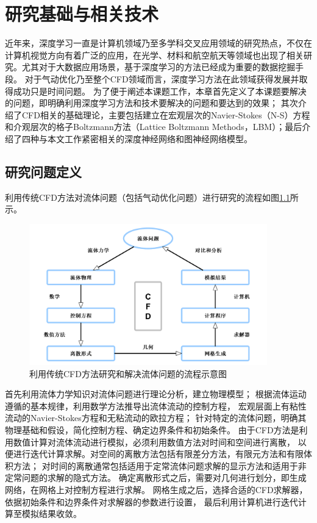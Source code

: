 \chapter{研究基础与相关技术}

近年来，深度学习一直是计算机领域乃至多学科交叉应用领域的研究热点，不仅在计算机视觉方向有着广泛的应用，在光学、材料和航空航天等领域也出现了相关研究。尤其对于大数据应用场景，基于深度学习的方法已经成为重要的数据挖掘手段。
对于气动优化乃至整个CFD领域而言，深度学习方法在此领域获得发展并取得成功只是时间问题。
为了便于阐述本课题工作，本章首先定义了本课题要解决的问题，即明确利用深度学习方法和技术要解决的问题和要达到的效果；
其次介绍了CFD相关的基础理论，主要包括建立在宏观层次的Navier-Stokes（N-S）方程和介观层次的格子Boltzmann方法（Lattice Boltzmann Methods，LBM）；最后介绍了四种与本文工作紧密相关的深度神经网络和图神经网络模型。

\section{研究问题定义}
利用传统CFD方法对流体问题（包括气动优化问题）进行研究的流程如图\ref{fig:cfdflow}所示。
\begin{figure}[htp]
	\centering
	\includegraphics[width=0.92\textwidth]{figures/cfdflow.pdf}
	\caption{利用传统CFD方法研究和解决流体问题的流程示意图}
	\label{fig:cfdflow}
\end{figure}


首先利用流体力学知识对流体问题进行理论分析，建立物理模型；
根据流体运动遵循的基本规律，利用数学方法推导出流体流动的控制方程，
宏观层面上有粘性流动的Navier-Stokes方程和无粘流动的欧拉方程；
针对特定的流体问题，明确其物理基础和假设，简化控制方程、确定边界条件和初始条件。
由于CFD方法是利用数值计算对流体流动进行模拟，必须利用数值方法对时间和空间进行离散，
以便进行迭代计算求解。对空间的离散方法包括有限差分方法，有限元方法和有限体积方法；
对时间的离散通常包括适用于定常流体问题求解的显示方法和适用于非定常问题的求解的隐式方法。
确定离散形式之后，需要对几何进行划分，即生成网络，在网格上对控制方程进行求解。
网格生成之后，选择合适的CFD求解器，依据初始条件和边界条件对求解器的参数进行设置，
最后利用计算机进行迭代计算至模拟结果收敛。



